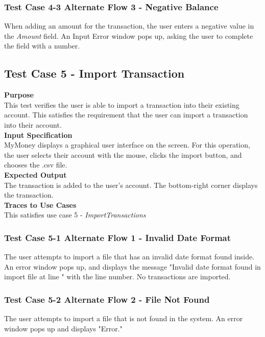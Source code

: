 \documentclass[12pt]{article}
\begin{document}
\subsubsection
{Test Case 4-3 Alternate Flow 3 - Negative Balance}
When adding an amount for the transaction, the user enters a negative value in the \textit{Amount} field. 
An Input Error window pops up, asking the user to complete the field with a number. 

\clearpage 

\subsection{Test Case 5 - Import Transaction} \label{TC-5}

\noindent
{\bf Purpose}\\
This test verifies the user is able to import a transaction into their existing account.
This satisfies the requirement that the user can import a transaction into their account.\\
                                                    
\noindent
{\bf Input Specification}\\
MyMoney displays a graphical user interface on the screen.
For this operation, the user selects their account with the mouse,
clicks the import button, and chooses the .csv file.\\
                                                    
\noindent
{\bf Expected Output}\\
The transaction is added to the user's account.
The bottom-right corner displays the transaction.\\

\noindent
{\bf Traces to Use Cases}\\
This satisfies use case 5 - \textit{ImportTransactions}\\

\subsubsection
{Test Case 5-1 Alternate Flow 1 - Invalid Date Format}

The user attempts to import a file that has an invalid date format found inside.
An error window pops up, and displays the message "Invalid date format found in import file at line " with the line number. No transactions are imported.

\subsubsection
{Test Case 5-2 Alternate Flow 2 - File Not Found}
The user attempts to import a file that is not found in the system. 
An error window pops up and displays "Error."
\end{document}
